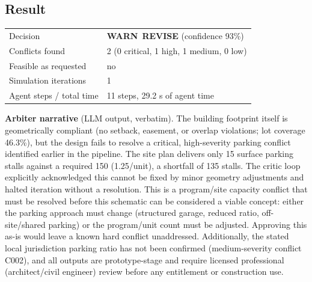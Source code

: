 \documentclass[10pt]{article}
\begin{document}
\subsection{Result}
\par
\begin{tabular}{p{4.2cm}p{11.8cm}}\toprule
Decision & \textcolor{warn}{\textbf{WARN}}\ \textbf{REVISE} (confidence 93\%) \\
Conflicts found & 2 (0 critical, 1 high, 1 medium, 0 low) \\
Feasible as requested & no \\
Simulation iterations & 1 \\
Agent steps / total time & 11 steps, 29.2 s of agent time \\
\bottomrule\end{tabular}

\textbf{Arbiter narrative} (LLM output, verbatim). The building footprint itself is geometrically compliant (no setback, easement, or overlap violations; lot coverage 46.3\%), but the design fails to resolve a critical, high-severity parking conflict identified earlier in the pipeline. The site plan delivers only 15 surface parking stalls against a required 150 (1.25/unit), a shortfall of 135 stalls. The critic loop explicitly acknowledged this cannot be fixed by minor geometry adjustments and halted iteration without a resolution. This is a program/site capacity conflict that must be resolved before this schematic can be considered a viable concept: either the parking approach must change (structured garage, reduced ratio, off-site/shared parking) or the program/unit count must be adjusted. Approving this as-is would leave a known hard conflict unaddressed. Additionally, the stated local jurisdiction parking ratio has not been confirmed (medium-severity conflict C002), and all outputs are prototype-stage and require licensed professional (architect/civil engineer) review before any entitlement or construction use.
\end{document}
